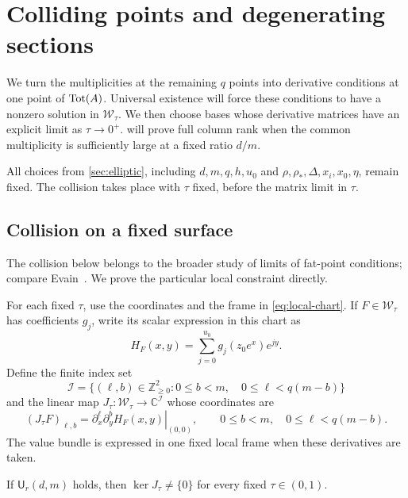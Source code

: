 \section{Colliding points and degenerating sections}
\label{sec:limits}

We turn the multiplicities at the remaining $q$ points into derivative conditions at one point of $\operatorname{Tot}(A)$. Universal existence will force these conditions to have a nonzero solution in $\mathcal{W}_\tau$. We then choose bases whose derivative matrices have an explicit limit as $\tau\to0^+$.  will prove full column rank when the common multiplicity is sufficiently large at a fixed ratio $d/m$.

All choices from \cref{sec:elliptic}, including $d,m,q,h,u_0$ and $\rho,\rho_*,\Delta,x_i,x_0,\eta$, remain fixed. The collision takes place with $\tau$ fixed, before the matrix limit in $\tau$.

\subsection{Collision on a fixed surface}

The collision below belongs to the broader study of limits of fat-point conditions; compare Evain~\cite[Sections~2 and~6]{Evain2007}. We prove the particular local constraint directly.

For each fixed $\tau$, use the coordinates and the frame in \eqref{eq:local-chart}. If $F\in\mathcal{W}_\tau$ has coefficients $g_j$, write its scalar expression in this chart as
\[
 H_F(x,y)=\sum_{j=0}^{u_0}g_j(z_0e^x)e^{jy}.
\]
Define the finite index set
\[
 \mathcal{I}=\{(\ell,b)\in\mathbb{Z}_{\geq0}^2:
                   0\leq b<m,\quad 0\leq\ell<q(m-b)\}
\]
and the linear map $J_\tau:\mathcal{W}_\tau\longrightarrow\mathbb{C}^{\mathcal{I}}$ whose coordinates are
\begin{equation}
 (J_\tau F)_{\ell,b}
   =\left.\partial_x^\ell\partial_y^b H_F(x,y)\right|_{(0,0)},
 \qquad 0\leq b<m,\quad 0\leq\ell<q(m-b).
 \label{eq:jet-rows}
\end{equation}
The value bundle is expressed in one fixed local frame when these derivatives are taken.

\begin{lemma}
\label{lem:collision}
If $\mathsf U_r(d,m)$ holds, then $\ker J_\tau\neq\{0\}$ for every fixed $\tau\in(0,1)$.
\end{lemma}

